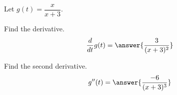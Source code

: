 \documentclass{ximera}
\author{Bobby Ramsey}
\begin{document}
\begin{exercise}

	Let $g(t) = \dfrac{x}{x+3}$.

	Find the derivative.  \[ \ddt g(t) = \answer{\frac{3}{(x+3)^2}} \]
	\begin{exercise}
		Find the second derivative.	
		\[ g''(t) = \answer{\frac{-6}{(x+3)^3}} \]
	\end{exercise}

\end{exercise}
\end{document}
